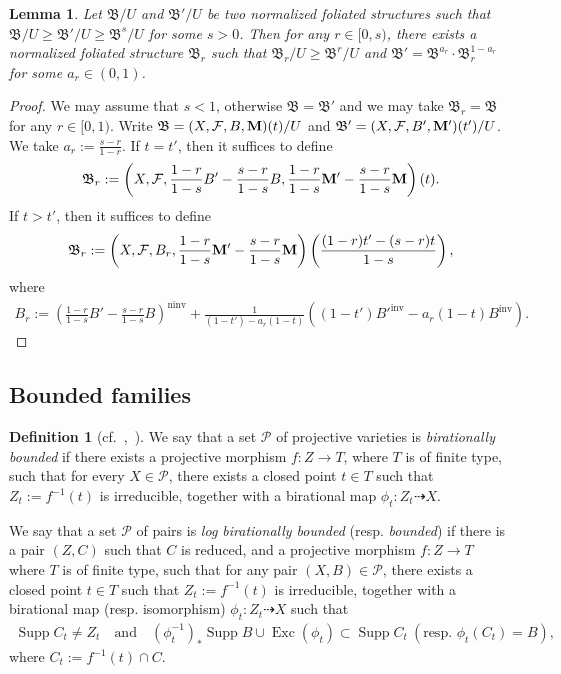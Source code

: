 \documentclass[11pt,reqno]{amsart}
\numberwithin{equation}{section}
\newcommand{\Mm}{{\bf{M}}}
\newcommand{\Exc}{\operatorname{Exc}}
\newcommand{\ninv}{\operatorname{ninv}}
\newcommand{\inv}{\operatorname{inv}}
\newcommand{\Supp}{\operatorname{Supp}}
\newcommand{\Bb}{{\mathfrak{B}}}
\newcommand{\Ff}{\mathcal{F}}
\newtheorem{lem}[thm]{Lemma}
\theoremstyle{definition}
\newtheorem{defn}[thm]{Definition}
\begin{document}
\begin{lem}\label{lem: construct smaller bb}
    Let $\Bb/U$ and $\Bb'/U$ be two normalized foliated structures such that $\Bb/U\geq\Bb'/U\geq\Bb^{s}/U$ for some $s>0$. Then for any $r\in [0,s)$, there exists a normalized foliated structure $\Bb_r$ such that $\Bb_r/U\geq\Bb^r/U$ and $\Bb'=\Bb^{a_r}\cdot\Bb_r^{1-a_r}$ for some $a_r\in (0,1)$. 
\end{lem}
\begin{proof}
We may assume that $s<1$, otherwise $\Bb=\Bb'$ and we may take $\Bb_r=\Bb$ for any $r\in [0,1)$. Write $\Bb=(X,\Ff,B,\Mm)(t)/U$ and $\Bb'=(X,\Ff,B',\Mm')(t')/U$. We take $a_r:=\frac{s-r}{1-r}$. 
If $t=t'$, then it suffices to define
    \begin{align*}
        \Bb_r:=\left(X,\Ff,\frac{1-r}{1-s}B'-\frac{s-r}{1-s}B,\frac{1-r}{1-s}\Mm'-\frac{s-r}{1-s}\Mm\right)(t).
    \end{align*}
If $t>t'$, then it suffices to define
    \begin{align*}
    \Bb_r:=\left(X,\Ff,B_r,\frac{1-r}{1-s}\Mm'-\frac{s-r}{1-s}\Mm\right)\left(\frac{(1-r)t'-(s-r)t}{1-s}\right),
    \end{align*}
where
    \begin{align*}
    B_r:=\left(\frac{1-r}{1-s}B'-\frac{s-r}{1-s}B\right)^{\ninv}+\frac{1}{(1-t')-a_r(1-t)}((1-t')B'^{\inv}-a_r(1-t)B^{\inv}).
    \end{align*}
\end{proof}

\subsection{Bounded families}\label{subsec: bounded}

\begin{defn}[{cf.~\cite[Definition~3.5.1]{HMX14},~\cite[2.19]{Bir19}}]\label{defn: bounded pairs}
We say that a set 
$\mathcal{P}$ 
of projective varieties is 
\emph{birationally bounded} 
if there exists a projective morphism 
$f\colon Z\rightarrow T$, 
where 
$T$ 
is of finite type, such that for every 
$X\in\mathcal{P}$, 
there exists a closed point 
$t\in T$
such that
$Z_t:=f^{-1}(t)$
is irreducible, together with
a birational map 
$\phi_t \colon Z_t\dashrightarrow X$.

We say that a set 
$\mathcal{P}$ 
of pairs is \emph{log birationally bounded} 
(resp. \emph{bounded}) 
if there is a pair 
$(Z,C)$ 
such that 
$C$ 
is reduced, 
and a projective morphism 
$f \colon Z\rightarrow T$ 
where 
$T$ 
is of finite type, such that for any pair
$(X,B)\in\mathcal{P}$, 
there exists a closed point 
$t\in T$
such that 
$Z_t:=f^{-1}(t)$
is irreducible, together with
a birational map (resp. isomorphism) 
$\phi_t \colon Z_t\dashrightarrow X$ 
such that 
\begin{align*}
\Supp C_t\neq Z_t
\quad 
\text{and}
\quad  
(\phi^{-1}_t)_\ast \Supp B
\cup
\Exc(\phi_t)
\subset
\Supp C_t\ \left(\text{resp. }\phi_t(C_t)=B\right),
\end{align*}
where $C_t:=f^{-1}(t)\cap C$. 
\end{defn}
\end{document}
